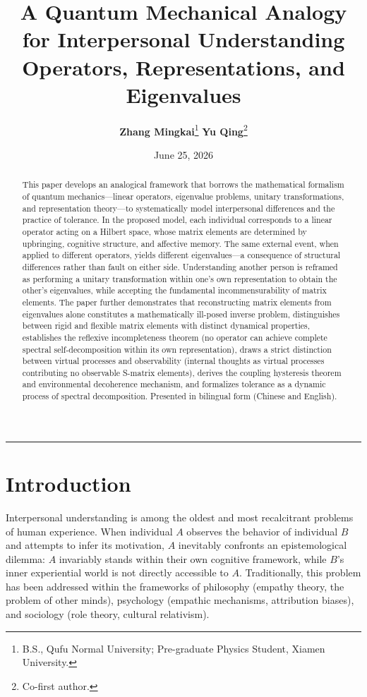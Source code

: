 ﻿\documentclass[11pt,a4paper]{article}
\title{A Quantum Mechanical Analogy\\for Interpersonal Understanding\\[4pt]
\large Operators, Representations, and Eigenvalues}
\author{\textbf{Zhang Mingkai}\thanks{B.S., Qufu Normal University; Pre-graduate Physics Student, Xiamen University.}
\quad \textbf{Yu Qing}\thanks{Co-first author.}}
\date{June 25, 2026}
\begin{document}
\maketitle

\begin{abstract}
\noindent
This paper develops an analogical framework that borrows the mathematical formalism of quantum mechanics---linear operators, eigenvalue problems, unitary transformations, and representation theory---to systematically model interpersonal differences and the practice of tolerance. In the proposed model, each individual corresponds to a linear operator acting on a Hilbert space, whose matrix elements are determined by upbringing, cognitive structure, and affective memory. The same external event, when applied to different operators, yields different eigenvalues---a consequence of structural differences rather than fault on either side. Understanding another person is reframed as performing a unitary transformation within one's own representation to obtain the other's eigenvalues, while accepting the fundamental incommensurability of matrix elements. The paper further demonstrates that reconstructing matrix elements from eigenvalues alone constitutes a mathematically ill-posed inverse problem, distinguishes between rigid and flexible matrix elements with distinct dynamical properties, establishes the reflexive incompleteness theorem (no operator can achieve complete spectral self-decomposition within its own representation), draws a strict distinction between virtual processes and observability (internal thoughts as virtual processes contributing no observable S-matrix elements), derives the coupling hysteresis theorem and environmental decoherence mechanism, and formalizes tolerance as a dynamic process of spectral decomposition. Presented in bilingual form (Chinese and English).
\end{abstract}

\vspace{4pt}
\hrule
\vspace{12pt}

\section{Introduction}

Interpersonal understanding is among the oldest and most recalcitrant problems of human experience. When individual $A$ observes the behavior of individual $B$ and attempts to infer its motivation, $A$ inevitably confronts an epistemological dilemma: $A$ invariably stands within their own cognitive framework, while $B$'s inner experiential world is not directly accessible to $A$. Traditionally, this problem has been addressed within the frameworks of philosophy (empathy theory, the problem of other minds), psychology (empathic mechanisms, attribution biases), and sociology (role theory, cultural relativism).
\end{document}
